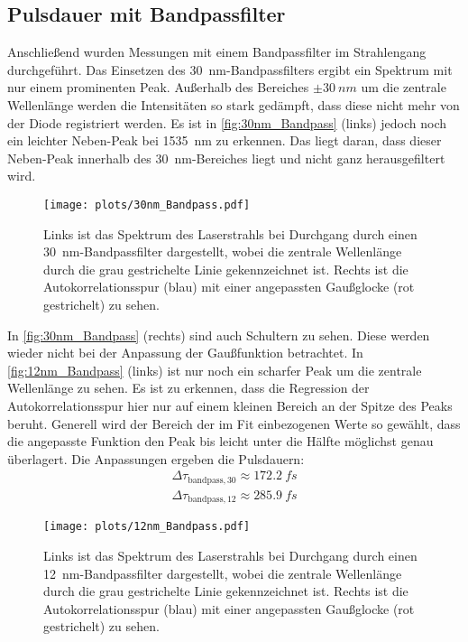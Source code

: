 \subsection{Pulsdauer mit Bandpassfilter}
    Anschließend wurden Messungen mit einem Bandpassfilter im Strahlengang durchgeführt.
    Das Einsetzen des \qty{30}{nm}-Bandpassfilters ergibt ein Spektrum mit nur einem prominenten Peak.
    Außerhalb des Bereiches $\pm\qty{30}{nm}$ um die zentrale Wellenlänge werden die Intensitäten so stark gedämpft, dass diese nicht mehr von der Diode registriert werden.
    Es ist in \autoref{fig:30nm_Bandpass} (links) jedoch noch ein leichter Neben-Peak bei \qty{1535}{nm} zu erkennen.
    Das liegt daran, dass dieser Neben-Peak innerhalb des \qty{30}{nm}-Bereiches liegt und nicht ganz herausgefiltert wird.    
    \vspace*{-0.3cm}
    \begin{figure}[ht]
        \centering\captionsetup{format=plain}
        \texttt{[image: plots/30nm\_Bandpass.pdf]} \vspace*{-0.5cm}
        \caption{Links ist das Spektrum des Laserstrahls bei Durchgang durch einen \qty{30}{nm}-Bandpassfilter dargestellt, wobei die zentrale Wellenlänge durch die grau gestrichelte Linie gekennzeichnet ist. Rechts ist die Autokorrelationsspur (blau) mit einer angepassten Gaußglocke (rot gestrichelt) zu sehen.}
        \label{fig:30nm_Bandpass}
    \end{figure}
    \FloatBarrier
    In \autoref{fig:30nm_Bandpass} (rechts) sind auch Schultern zu sehen.
    Diese werden wieder nicht bei der Anpassung der Gaußfunktion betrachtet.
    In \autoref{fig:12nm_Bandpass} (links) ist nur noch ein scharfer Peak um die zentrale Wellenlänge zu sehen.
    Es ist zu erkennen, dass die Regression der Autokorrelationsspur hier nur auf einem kleinen Bereich an der Spitze des Peaks beruht.
    Generell wird der Bereich der im Fit einbezogenen Werte so gewählt, dass die angepasste Funktion den Peak bis leicht unter die Hälfte möglichst genau überlagert.
    Die Anpassungen ergeben die Pulsdauern:
    \begin{align*}
        \Delta \tau_{\mathrm{bandpass,30}} \approx \qty{172,2}{fs} \\
        \Delta \tau_{\mathrm{bandpass,12}} \approx \qty{285,9}{fs}
    \end{align*}
    \begin{figure}[ht]
        \centering\captionsetup{format=plain}\vspace*{-1cm}
        \texttt{[image: plots/12nm\_Bandpass.pdf]} \vspace*{-0.5cm}
        \caption{Links ist das Spektrum des Laserstrahls bei Durchgang durch einen \qty{12}{nm}-Bandpassfilter dargestellt, wobei die zentrale Wellenlänge durch die grau gestrichelte Linie gekennzeichnet ist. Rechts ist die Autokorrelationsspur (blau) mit einer angepassten Gaußglocke (rot gestrichelt) zu sehen.}
        \label{fig:12nm_Bandpass}
    \end{figure}
    \FloatBarrier

